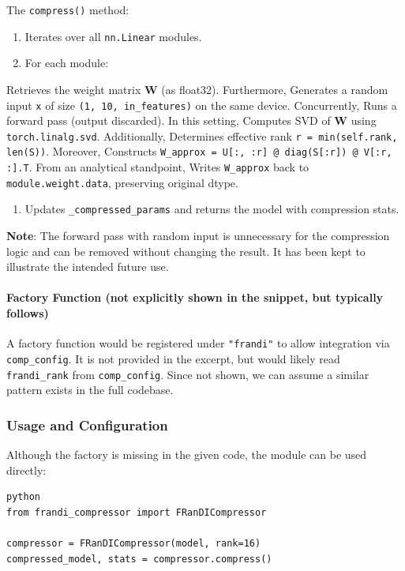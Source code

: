 The \texttt{compress()} method:

\begin{enumerate}
\item Iterates over all \texttt{nn.Linear} modules.
\item For each module:
\end{enumerate}
Retrieves the weight matrix \textbf{W} (as float32). Furthermore, Generates a random input \texttt{x} of size \texttt{(1, 10, in\_features)} on the same device. Concurrently, Runs a forward pass (output discarded). In this setting, Computes SVD of \textbf{W} using \texttt{torch.linalg.svd}. Additionally, Determines effective rank \texttt{r = min(self.rank, len(S))}. Moreover, Constructs \texttt{W\_approx = U[:, :r] @ diag(S[:r]) @ V[:r, :].T}. From an analytical standpoint, Writes \texttt{W\_approx} back to \texttt{module.weight.data}, preserving original dtype.

\begin{enumerate}
\item Updates \texttt{\_compressed\_params} and returns the model with compression stats.

\end{enumerate}
\textbf{Note}: The forward pass with random input is unnecessary for the compression logic and can be removed without changing the result. It has been kept to illustrate the intended future use.

\paragraph{Factory Function (not explicitly shown in the snippet, but typically follows)}

A factory function would be registered under \texttt{"frandi"} to allow integration via \texttt{comp\_config}. It is not provided in the excerpt, but would likely read \texttt{frandi\_rank} from \texttt{comp\_config}. Since not shown, we can assume a similar pattern exists in the full codebase.


\subsubsection*{Usage and Configuration}

Although the factory is missing in the given code, the module can be used directly:

\vspace{0.5em}
\begin{mdframed}[backgroundcolor=codebg, linecolor=codeframe, linewidth=1pt, roundcorner=4pt, innerleftmargin=2pt, innerrightmargin=5pt, innertopmargin=5pt, innerbottommargin=5pt]
\begin{lstlisting}
python
from frandi_compressor import FRanDICompressor

compressor = FRanDICompressor(model, rank=16)
compressed_model, stats = compressor.compress()
\end{lstlisting}
\end{mdframed}
\vspace{0.5em}


